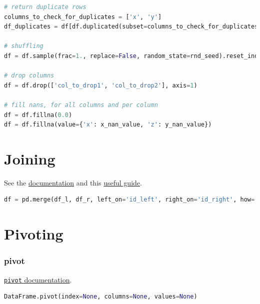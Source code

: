 \begin{lstlisting}[language=Python]
# return duplicate rows
columns_to_check_for_duplicates = ['x', 'y']
df_duplicates = df[df.duplicated(subset=columns_to_check_for_duplicates, keep=False)]

# shuffling
df = df.sample(frac=1., replace=False, random_state=rnd_seed).reset_index(drop=True)

# drop columns
df = df.drop(['col_to_drop1', 'col_to_drop2'], axis=1)

# fill nans, for all columns and per column 
df = df.fillna(0.0)
df = df.fillna(value={'x': x_nan_value, 'z': y_nan_value})
\end{lstlisting}

\clearpage

\section{Joining}
\label{pandas:join}

\noindent See the \href{https://pandas.pydata.org/pandas-docs/stable/user_guide/merging.html}{documentation} and this \href{http://chrisalbon.com/python/data_wrangling/pandas_join_merge_dataframe/}{useful guide}.

\begin{lstlisting}[language=Python]
df = pd.merge(df_l, df_r, left_on='id_left', right_on='id_right', how='left')
\end{lstlisting}

\section{Pivoting}
\label{pandas:pivoting}

\subsubsection{pivot}
\label{pandas:pivoting:pivot}

\noindent \href{http://pandas.pydata.org/pandas-docs/stable/reference/api/pandas.DataFrame.pivot.html}{\texttt{pivot} documentation}.

\begin{lstlisting}[language=Python]
DataFrame.pivot(index=None, columns=None, values=None)
\end{lstlisting}

